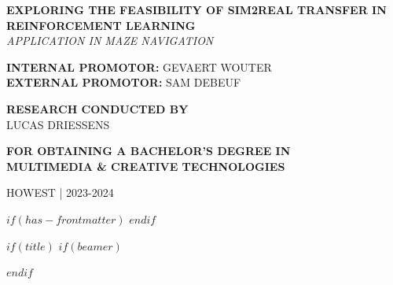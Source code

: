 \documentclass[12pt]{article}
\begin{document}
\begin{titlepage}
    \begin{adjustwidth}{1.5cm}{1.5cm}

    \MakeUppercase{\huge\textbf{Exploring the Feasibility of Sim2Real Transfer in Reinforcement Learning}} \\
    \MakeUppercase{\Large\textit{Application in Maze Navigation}}

    \vspace{1.25em}

    \noindent\MakeUppercase{\large\textbf{Internal promotor:}\large{ Gevaert Wouter}} \\
    \MakeUppercase{\large\textbf{External promotor:}\large{ Sam Debeuf}}

    \vspace{1.25em}

    \noindent\MakeUppercase{\large\textbf{Research conducted by}} \\
    \MakeUppercase{\Large{Lucas Driessens}}

    \vspace{1.25em}

    \noindent\MakeUppercase{\large\textbf{for obtaining a bachelor's degree in}} \\
    \MakeUppercase{\Large\textbf{Multimedia \& Creative Technologies}}

    \vspace{0.75em}

    \noindent\MakeUppercase{\large{Howest | 2023-2024}}
    \end{adjustwidth}
    \restoregeometry
    \normalfont
\end{titlepage}

\pagebreak
\thispagestyle{empty}
\mbox{}
\pagebreak

\renewcommand{\familydefault}{\rmdefault}
\setmainfont{TeX Gyre Pagella} %
\fontsize{11pt}{14pt}\selectfont



$if(has-frontmatter)$
$endif$

$if(title)$
$if(beamer)$
\frame{\titlepage}

\tableofcontents

$endif$
\end{document}
